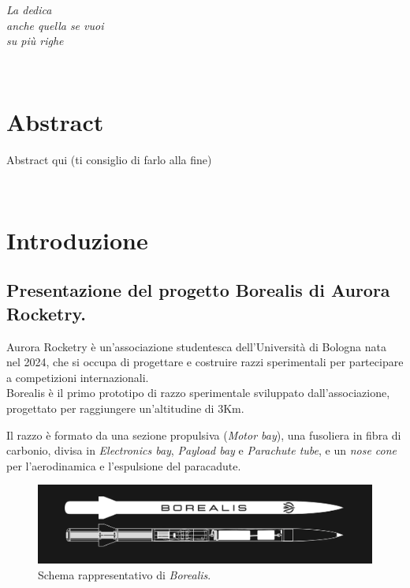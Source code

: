 \documentclass[12pt,a4paper,twoside]{book}
\begin{document}
\ifdefined\HCode
\else
\topmargin=5.5cm
\begin{flushright}
    \emph{
        \LARGE{La dedica}\\\vspace{3mm}
        \LARGE{anche quella se vuoi}\\\vspace{3mm}
        \LARGE{su più righe}
    }
\end{flushright}
\fi
\newpage~\newpage
{}
\chapter*{Abstract}
Abstract qui (ti consiglio di farlo alla fine)

\topmargin=-1cm
\tableofcontents
\thispagestyle{empty}
\listoftables
\thispagestyle{empty}
\listoffigures
\thispagestyle{empty}
\newpage~\newpage


\setcounter{chapter}{0}
\raggedbottom
\chapter{Introduzione} \label{chap:intro}
\pagestyle{plain}
\setcounter{page}{1}

\section{Presentazione del progetto Borealis di Aurora Rocketry.}
Aurora Rocketry è un'associazione studentesca dell'Università di Bologna nata 
nel 2024, che si occupa di progettare e costruire razzi sperimentali per 
partecipare a competizioni internazionali. \\
Borealis è il primo prototipo di razzo sperimentale sviluppato 
dall'associazione, progettato per raggiungere un'altitudine di 3Km.

Il razzo è formato da una sezione propulsiva (\emph{Motor bay}), una fusoliera 
in fibra di carbonio, divisa in \emph{Electronics bay}, \emph{Payload bay} e 
\emph{Parachute tube}, e un \emph{nose cone} per l'aerodinamica 
e l'espulsione del paracadute. \\
\begin{figure}[H]
    \centering
    \includegraphics[width=\textwidth]{img/borealis-schema.png}
    \caption{Schema rappresentativo di \emph{Borealis}.}
    \label{fig:borealis-schema}
\end{figure}
\end{document}
